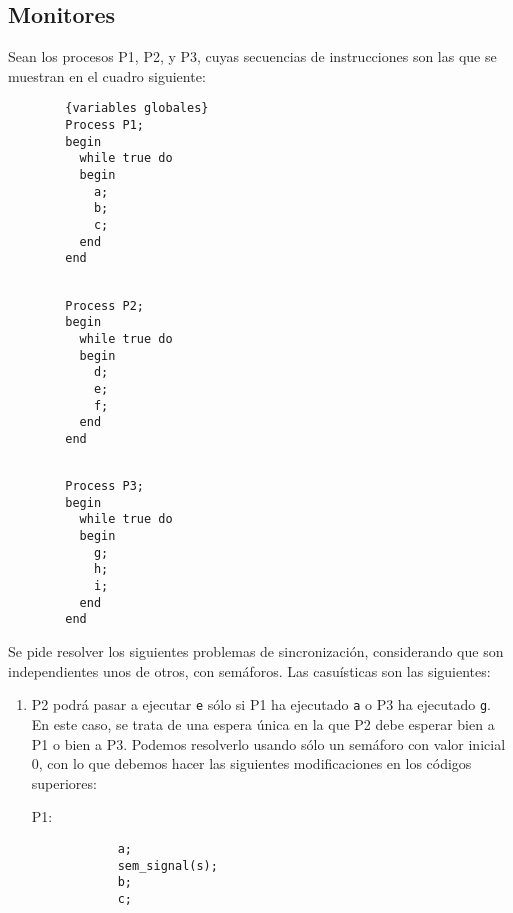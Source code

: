 \newpage
\subsection{Monitores}
\begin{ejercicio}
    Sean los procesos P1, P2, y P3, cuyas secuencias de instrucciones son las que se muestran en el cuadro siguiente:
    \setlength{\columnsep}{1cm} %
    \begin{multicols}{3}
        \begin{verbatim}
        {variables globales}
        Process P1;
        begin
          while true do
          begin
            a;
            b;
            c;
          end
        end
        \end{verbatim}
        
        \begin{verbatim}
            
        Process P2;
        begin
          while true do
          begin
            d;
            e;
            f;
          end
        end
        \end{verbatim}

        \begin{verbatim}
        
        Process P3;
        begin
          while true do
          begin
            g;
            h;
            i;
          end
        end
        \end{verbatim}
    \end{multicols}

    Se pide resolver los siguientes problemas de sincronización, considerando que son independientes unos de otros, con semáforos. Las casuísticas son las siguientes:
    \begin{enumerate}
        \item P2 podrá pasar a ejecutar \verb|e| sólo si P1 ha ejecutado \verb|a| o P3 ha ejecutado \verb|g|.\\

            En este caso, se trata de una espera única en la que P2 debe esperar bien a P1 o bien a P3. Podemos resolverlo usando sólo un semáforo con valor inicial 0, con lo que debemos hacer las siguientes modificaciones en los códigos superiores:
    \setlength{\columnsep}{1cm} %
    \begin{multicols}{3}
        P1:
        \begin{verbatim}
            a;
            sem_signal(s);
            b;
            c;
        \end{verbatim}
        

\end{multicols}
\end{enumerate}
\end{ejercicio}
